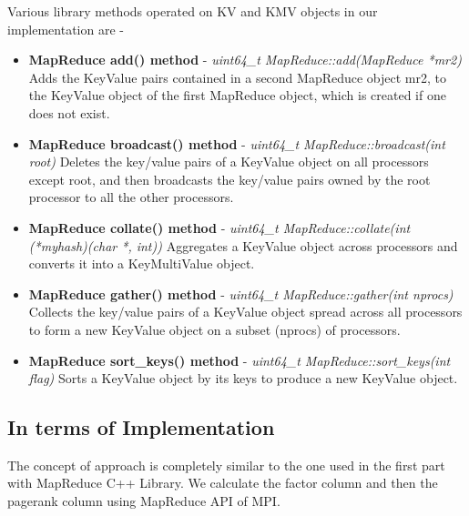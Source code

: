 \documentclass{article}
\begin{document}
     Various library methods operated on KV and KMV objects in our implementation are - 
     \begin{itemize}
         \item \textbf{MapReduce add() method} - \textit{uint64\_t MapReduce::add(MapReduce *mr2)} \newline
         Adds the KeyValue pairs contained in a second MapReduce object mr2, to the KeyValue object of the first MapReduce object, which is created if one does not exist. 
         
         \item \textbf{MapReduce broadcast() method} - \textit{uint64\_t MapReduce::broadcast(int root) } \newline
         Deletes the key/value pairs of a KeyValue object on all processors except root, and then broadcasts the key/value pairs owned by the root processor to all the other processors.
         
         \item \textbf{MapReduce collate() method} - \textit{uint64\_t MapReduce::collate(int (*myhash)(char *, int))  } \newline
         Aggregates a KeyValue object across processors and converts it into a KeyMultiValue object. 
         
         \item \textbf{MapReduce gather() method} - \textit{uint64\_t MapReduce::gather(int nprocs)  } \newline
         Collects the key/value pairs of a KeyValue object spread across all processors to form a new KeyValue object on a subset (nprocs) of processors. 
         
         \item \textbf{MapReduce sort\_keys() method} - \textit{uint64\_t MapReduce::sort\_keys(int flag)   } \newline
         Sorts a KeyValue object by its keys to produce a new KeyValue object. 
         
     \end{itemize}
    
    \clearpage
    
    \subsection{In terms of Implementation}  
    
    The concept of approach is completely similar to the one used in the first part with MapReduce C++ Library. We calculate the factor column and then the pagerank column using MapReduce API of MPI. 
    
\end{document}
